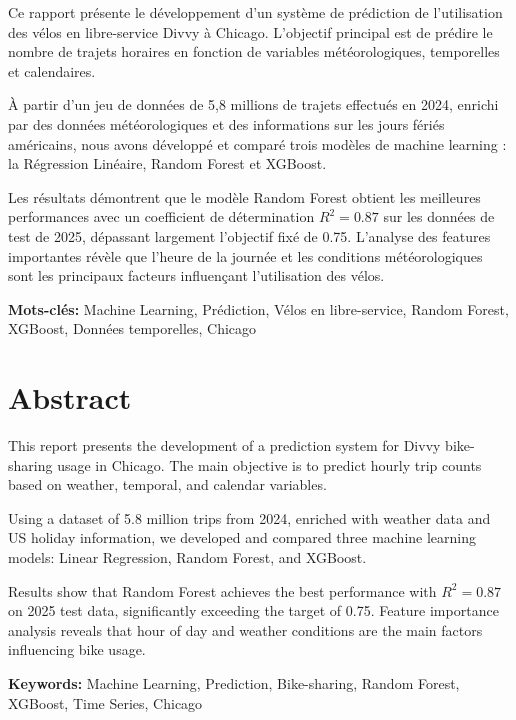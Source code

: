 \documentclass[12pt,a4paper]{article}
\begin{document}
Ce rapport présente le développement d'un système de prédiction de l'utilisation des vélos en libre-service Divvy à Chicago. L'objectif principal est de prédire le nombre de trajets horaires en fonction de variables météorologiques, temporelles et calendaires.

À partir d'un jeu de données de 5,8 millions de trajets effectués en 2024, enrichi par des données météorologiques et des informations sur les jours fériés américains, nous avons développé et comparé trois modèles de machine learning : la Régression Linéaire, Random Forest et XGBoost.

Les résultats démontrent que le modèle Random Forest obtient les meilleures performances avec un coefficient de détermination $R^2 = 0.87$ sur les données de test de 2025, dépassant largement l'objectif fixé de 0.75. L'analyse des features importantes révèle que l'heure de la journée et les conditions météorologiques sont les principaux facteurs influençant l'utilisation des vélos.

\textbf{Mots-clés:} Machine Learning, Prédiction, Vélos en libre-service, Random Forest, XGBoost, Données temporelles, Chicago

\section*{Abstract}

This report presents the development of a prediction system for Divvy bike-sharing usage in Chicago. The main objective is to predict hourly trip counts based on weather, temporal, and calendar variables.

Using a dataset of 5.8 million trips from 2024, enriched with weather data and US holiday information, we developed and compared three machine learning models: Linear Regression, Random Forest, and XGBoost.

Results show that Random Forest achieves the best performance with $R^2 = 0.87$ on 2025 test data, significantly exceeding the target of 0.75. Feature importance analysis reveals that hour of day and weather conditions are the main factors influencing bike usage.

\textbf{Keywords:} Machine Learning, Prediction, Bike-sharing, Random Forest, XGBoost, Time Series, Chicago

\newpage
\tableofcontents
\newpage
\listoffigures
\listoftables
\newpage
\end{document}
